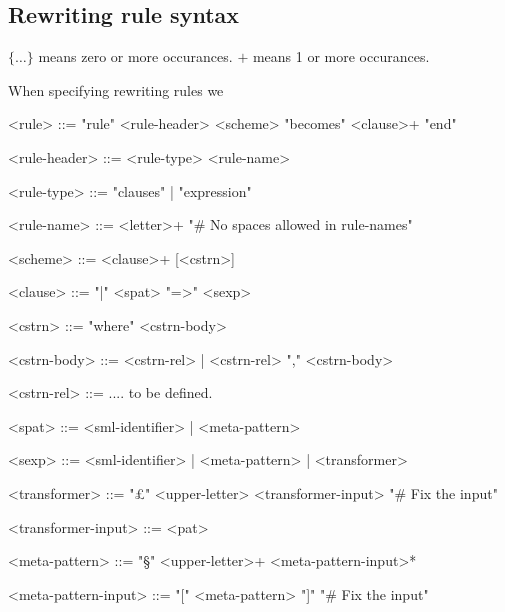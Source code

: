 \subsection{Rewriting rule syntax}

$\{ \ldots \}$ means zero or more occurances.
$+$ means 1 or more occurances.

When specifying rewriting rules we 


\setlength{\grammarindent}{7.3em}
\begin{grammar} 
 

  <rule> ::= "rule" <rule-header> <scheme> "becomes" <clause>+
  "end"

  <rule-header> ::= <rule-type> <rule-name>

  <rule-type> ::= "clauses" | "expression" 

  <rule-name> ::= <letter>+ \hfill "\# No spaces allowed in rule-names"

  <scheme> ::= <clause>+ [<cstrn>]


  <clause> ::= "|" <spat> "=>" <sexp>

  <cstrn> ::= "where" <cstrn-body> 

  <cstrn-body> ::= <cstrn-rel> | <cstrn-rel> "," <cstrn-body>

  <cstrn-rel> ::= .... to be defined.

  <spat> ::= <sml-identifier> | <meta-pattern>
  
  <sexp>   ::= <sml-identifier> | <meta-pattern> | <transformer>

  <transformer> ::= "£" <upper-letter> <transformer-input> \hfill "\# Fix the input"

  <transformer-input> ::= <pat>

  <meta-pattern> ::= "§" <upper-letter>+  <meta-pattern-input>*

  <meta-pattern-input> ::= "[" <meta-pattern> "]" \hfill "\# Fix the input" 

\end{grammar}


